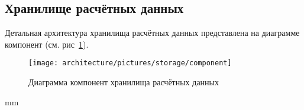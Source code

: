 \subsection{\large{Хранилище расчётных данных}}

Детальная архитектура хранилища расчётных данных представлена на диаграмме компонент
(см. рис\ \ref{pic:architecture__storage-component}).

\begin{figure}[H]
	\hspace*{-2.5 cm}\texttt{[image: architecture/pictures/storage/component]}
	\caption{Диаграмма компонент хранилища расчётных данных}
	\label{pic:architecture__storage-component}
\end{figure}
 mm
